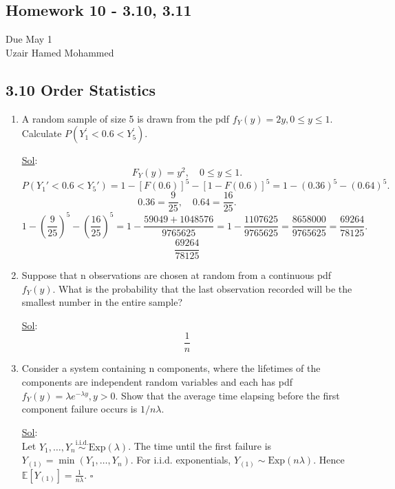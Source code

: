 \begin{center}
	\section*{Homework 10 - 3.10, 3.11}
	Due May 1 \\
	Uzair Hamed Mohammed
\end{center}


\subsection*{3.10 Order Statistics}
\begin{enumerate}
	\item[4.] A random sample of size 5 is drawn from the pdf \(f_Y(y) = 2y, 0 \leq y \leq 1\). Calculate \(P(Y_1^{\prime} < 0.6 < Y_5^{\prime})\).

	      \underline{Sol}: \\

	      \[
		      F_Y(y)=y^2,\quad 0\le y\le1.
	      \]
	      \[
		      P(Y_1'<0.6<Y_5') = 1 - [F(0.6)]^5 - [1-F(0.6)]^5 = 1 - (0.36)^5 - (0.64)^5.
	      \]
	      \[
		      0.36=\frac{9}{25},\quad 0.64=\frac{16}{25}.
	      \]
	      \[
		      1-\left(\frac{9}{25}\right)^5-\left(\frac{16}{25}\right)^5 = 1-\frac{59049+1048576}{9765625}=1-\frac{1107625}{9765625}=\frac{8658000}{9765625}=\frac{69264}{78125}.
	      \]
	      \[
		      \boxed{\frac{69264}{78125}}
	      \]

	\item[10.] Suppose that n observations are chosen at random from a continuous pdf \(f_Y(y)\). What is the probability that the last observation recorded will be the smallest number in the entire sample?

	      \underline{Sol}: \\

	      \[
		      \boxed{\frac{1}{n}}
	      \]

	\item[12.] Consider a system containing n components, where the lifetimes of the components are independent random variables and each has pdf \(f_Y (y) = \lambda e^{- \lambda y}, y > 0\). Show that the average time elapsing before the first component failure occurs is \(1 / n \lambda\).

	      \underline{Sol}: \\

	      Let \(Y_1,\dots,Y_n \stackrel{\text{i.i.d.}}{\sim} \text{Exp}(\lambda)\).
	      The time until the first failure is \(Y_{(1)} = \min(Y_1,\dots,Y_n)\).
	      For i.i.d. exponentials, \(Y_{(1)} \sim \text{Exp}(n\lambda)\).
	      Hence \(\mathbb{E}[Y_{(1)}] = \frac{1}{n\lambda}\). \(\square\)
\end{enumerate}

